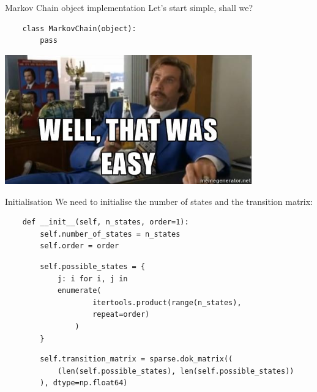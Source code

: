 \documentclass[10pt]{beamer}
\begin{document}
	\begin{frame}[fragile]{Markov Chain object implementation}
	Let's start simple, shall we?
	\pause
	\vspace{0.5cm}
		
	\begin{verbatim}
	class MarkovChain(object):
		pass
	\end{verbatim}
	
	\pause
	\begin{center}
		\includegraphics[width=0.8\textwidth]{imgs/easy.jpg}
	\end{center}
	\end{frame}
	
	\begin{frame}[fragile]{Initialisation}
		We need to initialise the number of states and the transition matrix:
	\pause
		
	\begin{verbatim}
	def __init__(self, n_states, order=1):
		self.number_of_states = n_states
		self.order = order
    \end{verbatim}
    
    \pause
    \begin{verbatim}
        self.possible_states = {
            j: i for i, j in
            enumerate(
            		itertools.product(range(n_states),
            		repeat=order)
            	)
        }
	\end{verbatim}
	\pause
	\begin{verbatim}
        self.transition_matrix = sparse.dok_matrix((
            (len(self.possible_states), len(self.possible_states))
        ), dtype=np.float64)
	\end{verbatim}
	
	\end{frame}
	
\end{document}
